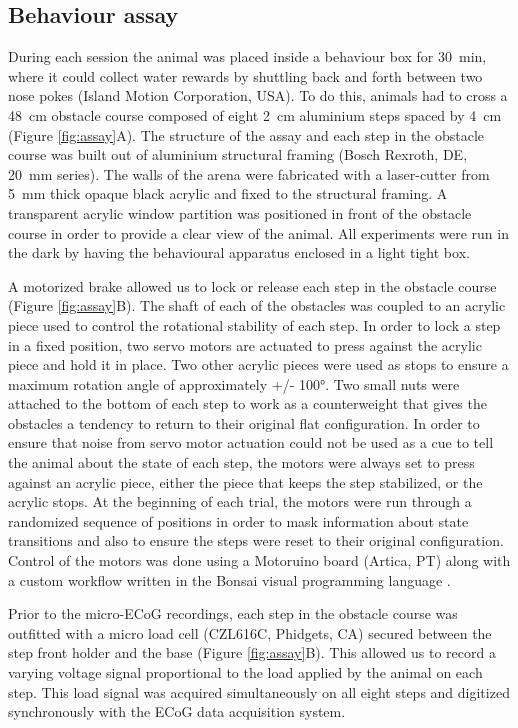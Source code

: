 \subsection{Behaviour assay}

During each session the animal was placed inside a behaviour box for \SI{30}{\minute}, where it could collect water rewards by shuttling back and forth between two nose pokes (Island Motion Corporation, USA). To do this, animals had to cross a \SI{48}{\centi\meter} obstacle course composed of eight \SI{2}{\centi\meter} aluminium steps spaced by \SI{4}{\centi\meter} (Figure \ref{fig:assay}A). The structure of the assay and each step in the obstacle course was built out of aluminium structural framing (Bosch Rexroth, DE, \SI{20}{\milli\meter} series). The walls of the arena were fabricated with a laser-cutter from \SI{5}{\milli\meter} thick opaque black acrylic and fixed to the structural framing. A transparent acrylic window partition was positioned in front of the obstacle course in order to provide a clear view of the animal. All experiments were run in the dark by having the behavioural apparatus enclosed in a light tight box.

A motorized brake allowed us to lock or release each step in the obstacle course (Figure \ref{fig:assay}B). The shaft of each of the obstacles was coupled to an acrylic piece used to control the rotational stability of each step. In order to lock a step in a fixed position, two servo motors are actuated to press against the acrylic piece and hold it in place. Two other acrylic pieces were used as stops to ensure a maximum rotation angle of approximately +/- \ang{100}. Two small nuts were attached to the bottom of each step to work as a counterweight that gives the obstacles a tendency to return to their original flat configuration. In order to ensure that noise from servo motor actuation could not be used as a cue to tell the animal about the state of each step, the motors were always set to press against an acrylic piece, either the piece that keeps the step stabilized, or the acrylic stops. At the beginning of each trial, the motors were run through a randomized sequence of positions in order to mask information about state transitions and also to ensure the steps were reset to their original configuration. Control of the motors was done using a Motoruino board (Artica, PT) along with a custom workflow written in the Bonsai visual programming language \citep{Lopes2015a}.

Prior to the micro-ECoG recordings, each step in the obstacle course was outfitted with a micro load cell (CZL616C, Phidgets, CA) secured between the step front holder and the base (Figure \ref{fig:assay}B). This allowed us to record a varying voltage signal proportional to the load applied by the animal on each step. This load signal was acquired simultaneously on all eight steps and digitized synchronously with the ECoG data acquisition system.

